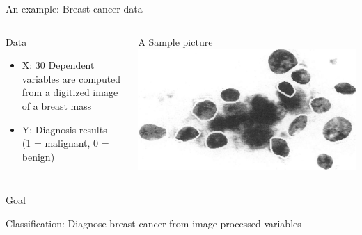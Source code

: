 \documentclass[ignorenonframetext,]{beamer}
\begin{document}
\begin{frame}{An example: Breast cancer data}

\begin{columns}
\begin{column}{0.5\textwidth}
   \begin{block}{Data}
    \begin{itemize}
    \item X: 30 Dependent variables are computed from a digitized image of a breast mass
    \item Y: Diagnosis results\\ 
    (1 = malignant, 0 = benign)
    \end{itemize}
   \end{block}
\end{column}
\begin{column}{0.5\textwidth}  %
    \begin{block}{A Sample picture}
    \includegraphics{./pic/breast_cancer.png}
    \end{block}
\end{column}
\end{columns}

\begin{block}{Goal}

Classification: Diagnose breast cancer from image-processed variables

\end{block}

\end{frame}
\end{document}
